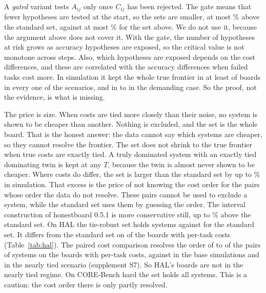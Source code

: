 \documentclass[11pt]{article}
\begin{document}
A \emph{gated} variant tests $A_{ij}$ only once $C_{ij}$ has been rejected. The gate means that fewer hypotheses are tested at the start, so the sets are smaller, at most \NumValRobGatedExcessMax\% above the standard set, against at most \NumValRobExcessMax\% for the set above. We do not use it, because the argument above does not cover it. With the gate, the number of hypotheses at risk grows as accuracy hypotheses are exposed, so the critical value is not monotone across steps. Also, which hypotheses are exposed depends on the cost differences, and these are correlated with the accuracy differences when failed tasks cost more. In simulation it kept the whole true frontier in at least \NumValGatedBaseJointMin{} of boards in every one of the \NumValScenarios{} scenarios, and in \NumStressGatedMin{} to \NumStressGatedMax{} in the demanding case. So the proof, not the evidence, is what is missing.

The price is size. When costs are tied more closely than their noise, no system is shown to be cheaper than another. Nothing is excluded, and the set is the whole board. That is the honest answer: the data cannot say which systems are cheaper, so they cannot resolve the frontier. The set does not shrink to the true frontier when true costs are exactly tied. A truly dominated system with an exactly tied dominating twin is kept at any $T$, because the twin is almost never shown to be cheaper. Where costs do differ, the set is larger than the standard set by up to \NumValRobExcessMax\% in simulation. That excess is the price of not knowing the cost order for the pairs whose order the data do not resolve. These pairs cannot be used to exclude a system, while the standard set uses them by guessing the order. The interval construction of honestboard 0.5.1 is more conservative still, up to \NumValRobIntExcessMax\% above the standard set. On HAL the tie-robust set holds \NumHalTieRobustSet{} systems against \NumHalFrontierSet{} for the standard set. It differs from the standard set on \NumHalTieRobustBoardsLarger{} of the \NumHalBoardsPerTask{} boards with per-task costs (Table~\ref{tab:hal}). The paired cost comparison resolves the order of \NumCostSepHalMin{} to \NumCostSepHalMax{} of the pairs of systems on the \NumHalBoardsPerTask{} boards with per-task costs, against \NumCostSepSimBase{} in the base simulations and \NumCostSepSimTied{} in the nearly tied scenario (supplement S7). So HAL's boards are not in the nearly tied regime. On CORE-Bench hard the set holds all \NumCorebenchHardSystems{} systems. This is a caution: the cost order there is only partly resolved.
\end{document}
